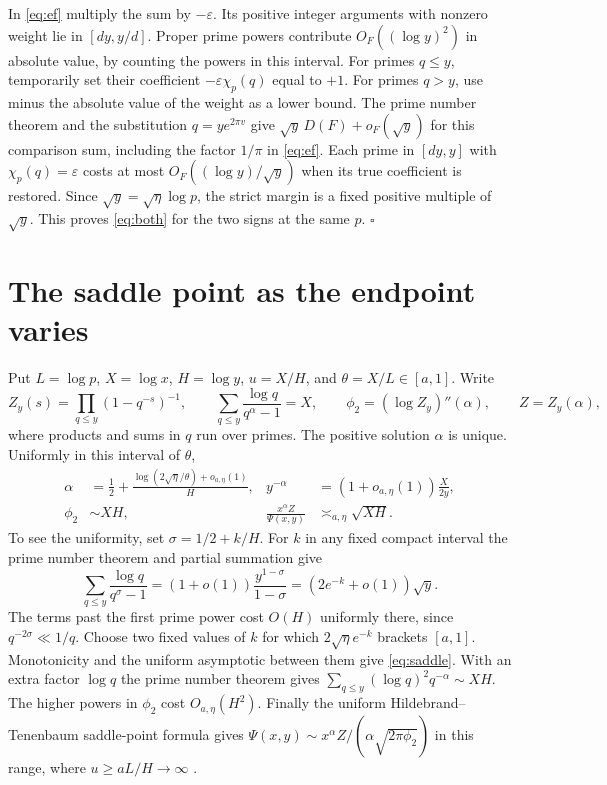 \documentclass[11pt]{article}
\newcommand{\ch}{\chi_p}
\newcommand{\ep}{\varepsilon}
\begin{document}
In \eqref{eq:ef} multiply the sum by \(-\ep\). Its positive integer
arguments with nonzero weight lie in \([dy,y/d]\). Proper prime powers
contribute \(O_F((\log y)^2)\) in absolute value, by counting the powers
in this interval. For primes \(q\le y\), temporarily set their
coefficient \(-\ep\ch(q)\) equal to \(+1\). For primes \(q>y\), use
minus the absolute value of the weight as a lower bound. The prime
number theorem and the substitution \(q=ye^{2\pi v}\) give
\(\sqrt y\,D(F)+o_F(\sqrt y)\) for this comparison sum, including the
factor \(1/\pi\) in \eqref{eq:ef}. Each prime in \([dy,y]\) with
\(\ch(q)=\ep\) costs at most \(O_F((\log y)/\sqrt y)\) when its true
coefficient is restored. Since \(\sqrt y=\sqrt\eta\log p\), the strict
margin is a fixed positive multiple of \(\sqrt y\). This
proves \eqref{eq:both} for the two signs at the same \(p\).
\hfill\(\square\)

\section{The saddle point as the endpoint varies}
Put \(L=\log p\), \(X=\log x\), \(H=\log y\), \(u=X/H\), and
\(\theta=X/L\in[a,1]\). Write
\[
 Z_y(s)=\prod_{q\le y}(1-q^{-s})^{-1},\qquad
 \sum_{q\le y}\frac{\log q}{q^\alpha-1}=X,\qquad
 \phi_2=(\log Z_y)''(\alpha),\qquad Z=Z_y(\alpha),
\]
where products and sums in \(q\) run over primes. The positive solution
\(\alpha\) is unique. Uniformly in this interval of \(\theta\),
\begin{align}
 \alpha&=\frac12+\frac{\log(2\sqrt\eta/\theta)+o_{a,\eta}(1)}{H},
 &y^{-\alpha}&=(1+o_{a,\eta}(1))\frac{X}{2y},\label{eq:saddle}\\
 \phi_2&\sim XH,
 &\frac{x^\alpha Z}{\Psi(x,y)}&\asymp_{a,\eta}\sqrt{XH}.\label{eq:ht}
\end{align}
To see the uniformity, set \(\sigma=1/2+k/H\). For \(k\) in any fixed
compact interval the prime number theorem and partial summation give
\[
 \sum_{q\le y}\frac{\log q}{q^\sigma-1}
 = (1+o(1))\frac{y^{1-\sigma}}{1-\sigma}
 = (2e^{-k}+o(1))\sqrt y .
\]
The terms past the first prime power cost \(O(H)\) uniformly there,
since \(q^{-2\sigma}\ll 1/q\). Choose two fixed values of \(k\) for
which \(2\sqrt\eta e^{-k}\) brackets \([a,1]\). Monotonicity and the
uniform asymptotic between them give \eqref{eq:saddle}. With an extra
factor \(\log q\) the prime number theorem gives
\(\sum_{q\le y}(\log q)^2q^{-\alpha}\sim XH\). The higher powers in
\(\phi_2\) cost \(O_{a,\eta}(H^2)\).
Finally the uniform Hildebrand--Tenenbaum saddle-point formula gives
\(\Psi(x,y)\sim x^\alpha Z/(\alpha\sqrt{2\pi\phi_2})\) in this range,
where \(u\ge aL/H\to\infty\) \cite[Theorem 1.6]{ht}.
\end{document}
